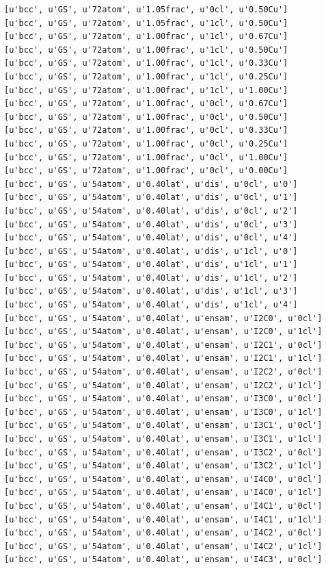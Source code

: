 \documentclass[number, sort&compress, review, 12pt]{elsarticle}
\begin{document}
\begin{verbatim}
[u'bcc', u'GS', u'72atom', u'1.05frac', u'0cl', u'0.50Cu']
[u'bcc', u'GS', u'72atom', u'1.05frac', u'1cl', u'0.50Cu']
[u'bcc', u'GS', u'72atom', u'1.00frac', u'1cl', u'0.67Cu']
[u'bcc', u'GS', u'72atom', u'1.00frac', u'1cl', u'0.50Cu']
[u'bcc', u'GS', u'72atom', u'1.00frac', u'1cl', u'0.33Cu']
[u'bcc', u'GS', u'72atom', u'1.00frac', u'1cl', u'0.25Cu']
[u'bcc', u'GS', u'72atom', u'1.00frac', u'1cl', u'1.00Cu']
[u'bcc', u'GS', u'72atom', u'1.00frac', u'0cl', u'0.67Cu']
[u'bcc', u'GS', u'72atom', u'1.00frac', u'0cl', u'0.50Cu']
[u'bcc', u'GS', u'72atom', u'1.00frac', u'0cl', u'0.33Cu']
[u'bcc', u'GS', u'72atom', u'1.00frac', u'0cl', u'0.25Cu']
[u'bcc', u'GS', u'72atom', u'1.00frac', u'0cl', u'1.00Cu']
[u'bcc', u'GS', u'72atom', u'1.00frac', u'0cl', u'0.00Cu']
[u'bcc', u'GS', u'54atom', u'0.40lat', u'dis', u'0cl', u'0']
[u'bcc', u'GS', u'54atom', u'0.40lat', u'dis', u'0cl', u'1']
[u'bcc', u'GS', u'54atom', u'0.40lat', u'dis', u'0cl', u'2']
[u'bcc', u'GS', u'54atom', u'0.40lat', u'dis', u'0cl', u'3']
[u'bcc', u'GS', u'54atom', u'0.40lat', u'dis', u'0cl', u'4']
[u'bcc', u'GS', u'54atom', u'0.40lat', u'dis', u'1cl', u'0']
[u'bcc', u'GS', u'54atom', u'0.40lat', u'dis', u'1cl', u'1']
[u'bcc', u'GS', u'54atom', u'0.40lat', u'dis', u'1cl', u'2']
[u'bcc', u'GS', u'54atom', u'0.40lat', u'dis', u'1cl', u'3']
[u'bcc', u'GS', u'54atom', u'0.40lat', u'dis', u'1cl', u'4']
[u'bcc', u'GS', u'54atom', u'0.40lat', u'ensam', u'I2C0', u'0cl']
[u'bcc', u'GS', u'54atom', u'0.40lat', u'ensam', u'I2C0', u'1cl']
[u'bcc', u'GS', u'54atom', u'0.40lat', u'ensam', u'I2C1', u'0cl']
[u'bcc', u'GS', u'54atom', u'0.40lat', u'ensam', u'I2C1', u'1cl']
[u'bcc', u'GS', u'54atom', u'0.40lat', u'ensam', u'I2C2', u'0cl']
[u'bcc', u'GS', u'54atom', u'0.40lat', u'ensam', u'I2C2', u'1cl']
[u'bcc', u'GS', u'54atom', u'0.40lat', u'ensam', u'I3C0', u'0cl']
[u'bcc', u'GS', u'54atom', u'0.40lat', u'ensam', u'I3C0', u'1cl']
[u'bcc', u'GS', u'54atom', u'0.40lat', u'ensam', u'I3C1', u'0cl']
[u'bcc', u'GS', u'54atom', u'0.40lat', u'ensam', u'I3C1', u'1cl']
[u'bcc', u'GS', u'54atom', u'0.40lat', u'ensam', u'I3C2', u'0cl']
[u'bcc', u'GS', u'54atom', u'0.40lat', u'ensam', u'I3C2', u'1cl']
[u'bcc', u'GS', u'54atom', u'0.40lat', u'ensam', u'I4C0', u'0cl']
[u'bcc', u'GS', u'54atom', u'0.40lat', u'ensam', u'I4C0', u'1cl']
[u'bcc', u'GS', u'54atom', u'0.40lat', u'ensam', u'I4C1', u'0cl']
[u'bcc', u'GS', u'54atom', u'0.40lat', u'ensam', u'I4C1', u'1cl']
[u'bcc', u'GS', u'54atom', u'0.40lat', u'ensam', u'I4C2', u'0cl']
[u'bcc', u'GS', u'54atom', u'0.40lat', u'ensam', u'I4C2', u'1cl']
[u'bcc', u'GS', u'54atom', u'0.40lat', u'ensam', u'I4C3', u'0cl']

\end{verbatim}
\end{document}
